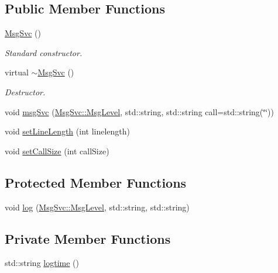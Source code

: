 \subsection*{Public Member Functions}
\begin{DoxyCompactItemize}
\item 
\hyperlink{classMsgSvc_a67dd82487821da06312e20c1fc68b85a}{MsgSvc} ()
\begin{DoxyCompactList}\small\item\em Standard constructor. \item\end{DoxyCompactList}\item 
virtual \hyperlink{classMsgSvc_a07f15da0052e8703a89b2fc66382fe0e}{$\sim$MsgSvc} ()
\begin{DoxyCompactList}\small\item\em Destructor. \item\end{DoxyCompactList}\item 
void \hyperlink{classMsgSvc_ad25f18047920cc59a314e5098259711c}{msgSvc} (\hyperlink{classMsgSvc_ae671eb7301996cd049d2da8a65925926}{MsgSvc::MsgLevel}, std::string, std::string call=std::string(\char`\"{}\char`\"{}))
\item 
void \hyperlink{classMsgSvc_ab741c391e80fcbf13eb2e60e48dc7536}{setLineLength} (int linelength)
\item 
void \hyperlink{classMsgSvc_a50854fb6f9df98bc170f690941747b61}{setCallSize} (int callSize)
\end{DoxyCompactItemize}
\subsection*{Protected Member Functions}
\begin{DoxyCompactItemize}
\item 
void \hyperlink{classMsgSvc_ad16d082e1bed97d14344d4942664d370}{log} (\hyperlink{classMsgSvc_ae671eb7301996cd049d2da8a65925926}{MsgSvc::MsgLevel}, std::string, std::string)
\end{DoxyCompactItemize}
\subsection*{Private Member Functions}
\begin{DoxyCompactItemize}
\item 
std::string \hyperlink{classMsgSvc_a74b20f11493ffbe27801bc1857fd079e}{logtime} ()
\end{DoxyCompactItemize}
